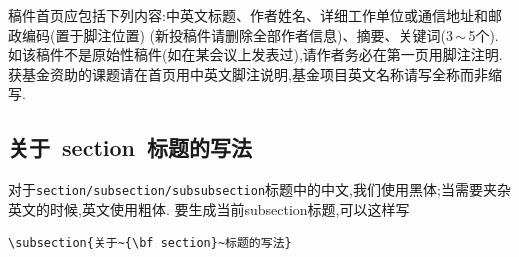 \documentclass{Style/aas}
\begin{document}
稿件首页应包括下列内容:中英文标题、作者姓名、详细工作单位或通信地址和邮政编码(置于脚注位置)
(新投稿件请删除全部作者信息)、摘要、关键词(3\,$\sim$\,5个).
如该稿件不是原始性稿件(如在某会议上发表过),请作者务必在第一页用脚注注明.
获基金资助的课题请在首页用中英文脚注说明,基金项目英文名称请写全称而非缩写.

\subsection{关于~{\bf section}~标题的写法}
对于\verb|section/subsection/subsubsection|标题中的中文,我们使用黑体;当需要夹杂英文的时候,英文使用粗体.
要生成当前subsection标题,可以这样写
\begin{verbatim}
\subsection{关于~{\bf section}~标题的写法}
\end{verbatim}
\end{document}
